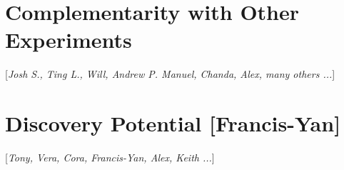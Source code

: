 \documentclass[modern,linenumbers]{aastex62}
\newcommand{\Contributors}[1]{ {\footnotesize [\textit{#1}]}}
\newcommand{\Contact}[1]{ {\footnotesize [\textbf{#1}]}}
\begin{document}
\section{Complementarity with Other Experiments}
\Contributors{Josh S., Ting L., Will, Andrew P. Manuel, Chanda, Alex, many others ...}
\label{sec:complementarity}



\section{Discovery Potential \Contact{Francis-Yan}}
\Contributors{Tony, Vera, Cora, Francis-Yan, Alex, Keith ...}
\label{sec:discovery}
\end{document}
